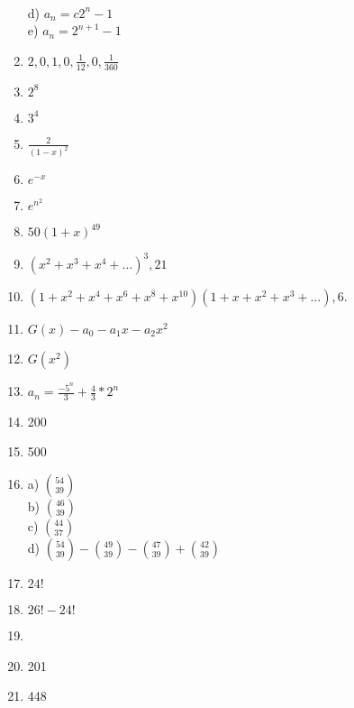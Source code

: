 \documentclass[11pt]{article}
\begin{document}
\begin{enumerate}
	\\d) $a_n = c2^n - 1$
	\\e) $a_n = 2^{n + 1} - 1$
\item $2,0,1,0,\frac{1}{12},0,\frac{1}{360}$
\item $2^8$
\item $3^4$
\item $\frac{2}{(1-x)^2}$
\item $e^{-x}$
\item $e^{n^2}$
\item $50(1+x)^{49}$
\item $(x^2 + x^3 + x^4 + ...)^3, 21$
\item $(1 + x^2 + x^4 + x^6 + x^8 + x^{10})(1 + x + x^2 + x^3 + ...), 6. $
\item $G(x) - a_0 - a_1x - a_2x^2$
\item $G(x^2)$
\item $a_n = \frac{-5^n}{3} + \frac{4}{3} * 2^n$
\item 200
\item 500
\item a) ${54\choose 39}$
	\\b) ${46\choose 39}$
	\\c) ${44\choose 37}$
	\\d) ${54\choose 39} - {49\choose 39} - {47\choose 39} + {42\choose 39}$
\item $24!$
\item $26! - 24!$
\item 
\item 201
\item 448
\end{enumerate}
\end{document}
